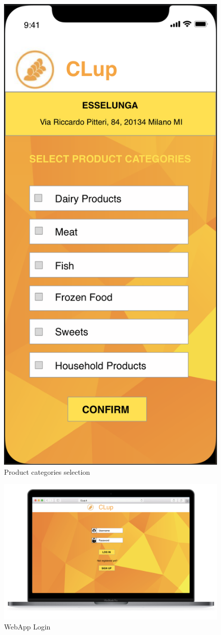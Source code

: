 \documentclass{article}
\begin{document}
\begin{figure}[H]
  \includegraphics[width=0.4\linewidth]{ProductCategories.png}
  \centering
  \caption{Product categories selection} 
\end{figure}

\begin{figure}[H]
  \includegraphics[width=\linewidth]{WebAppLogin.png}
  \centering
  \caption{WebApp Login} 
\end{figure}
\end{document}
